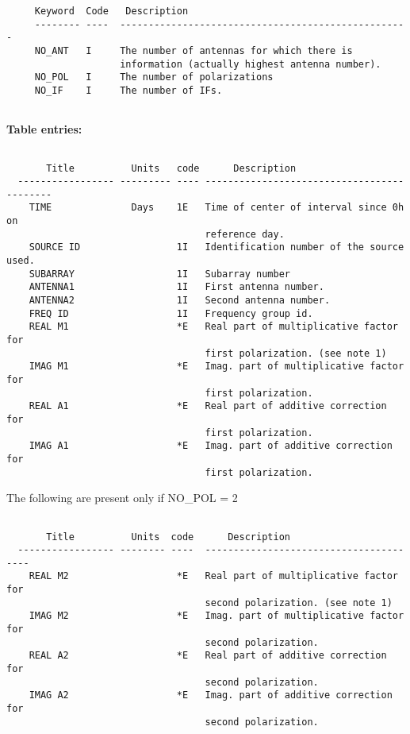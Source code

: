 \begin{verbatim}
     Keyword  Code   Description
     -------- ----  ---------------------------------------------------
     NO_ANT   I     The number of antennas for which there is
                    information (actually highest antenna number).
     NO_POL   I     The number of polarizations
     NO_IF    I     The number of IFs.
 
\end{verbatim}
{\bf Table entries:}
\begin{verbatim}

       Title          Units   code      Description
  ----------------- --------- ---- -------------------------------------------
    TIME              Days    1E   Time of center of interval since 0h on
                                   reference day.
    SOURCE ID                 1I   Identification number of the source used.
    SUBARRAY                  1I   Subarray number
    ANTENNA1                  1I   First antenna number.
    ANTENNA2                  1I   Second antenna number.
    FREQ ID                   1I   Frequency group id.
    REAL M1                   *E   Real part of multiplicative factor for
                                   first polarization. (see note 1)
    IMAG M1                   *E   Imag. part of multiplicative factor for
                                   first polarization.
    REAL A1                   *E   Real part of additive correction for
                                   first polarization.
    IMAG A1                   *E   Imag. part of additive correction for
                                   first polarization.

\end{verbatim}
The following are present only if NO\_POL = 2
\begin{verbatim}

       Title          Units  code      Description
  ----------------- -------- ----  ---------------------------------------
    REAL M2                   *E   Real part of multiplicative factor for
                                   second polarization. (see note 1)
    IMAG M2                   *E   Imag. part of multiplicative factor for
                                   second polarization.
    REAL A2                   *E   Real part of additive correction for
                                   second polarization.
    IMAG A2                   *E   Imag. part of additive correction for
                                   second polarization.
\end{verbatim}



